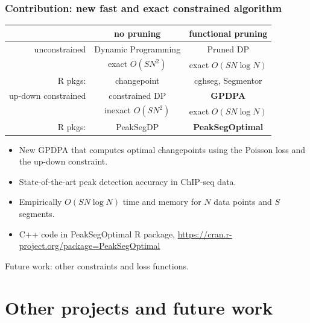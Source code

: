 \documentclass{beamer}
\begin{document}
\begin{frame}
  \frametitle{Contribution: new fast and exact constrained algorithm}
  \begin{tabular}{r|c|c}
    & no pruning & functional pruning \\
    \hline
    unconstrained & Dynamic Programming & Pruned DP \\
     & exact $O(S N^2)$ & exact $O(SN\log N)$\\
    R pkgs: & changepoint & cghseg, Segmentor\\
    \hline
    up-down constrained & constrained DP & \textbf{GPDPA} \\
     & inexact $O(SN^2)$ & exact $O(SN\log N)$\\
    R pkgs: & PeakSegDP & \textbf{PeakSegOptimal}\\
    \hline
  \end{tabular}
  \begin{itemize}
  \item New GPDPA that computes optimal changepoints 
    using the Poisson loss and the up-down constraint.
  \item State-of-the-art peak detection accuracy in ChIP-seq data.
  \item Empirically $O(S N \log N)$ time and memory for $N$ data
    points and $S$ segments.
  \item C++ code in PeakSegOptimal R package, 
    \url{https://cran.r-project.org/package=PeakSegOptimal}
  \end{itemize}
  Future work: other constraints and loss functions.
\end{frame}

\section{Other projects and future work}
\end{document}
